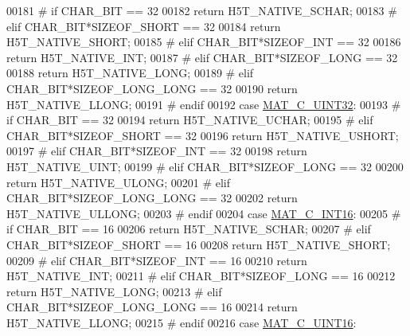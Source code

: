 \begin{DoxyCode}
00181 \textcolor{preprocessor}{#       if CHAR\_BIT == 32}
00182             \textcolor{keywordflow}{return} H5T\_NATIVE\_SCHAR;
00183 \textcolor{preprocessor}{#       elif CHAR\_BIT*SIZEOF\_SHORT == 32}
00184             \textcolor{keywordflow}{return} H5T\_NATIVE\_SHORT;
00185 \textcolor{preprocessor}{#       elif CHAR\_BIT*SIZEOF\_INT == 32}
00186             \textcolor{keywordflow}{return} H5T\_NATIVE\_INT;
00187 \textcolor{preprocessor}{#       elif CHAR\_BIT*SIZEOF\_LONG == 32}
00188             \textcolor{keywordflow}{return} H5T\_NATIVE\_LONG;
00189 \textcolor{preprocessor}{#       elif CHAR\_BIT*SIZEOF\_LONG\_LONG == 32}
00190             \textcolor{keywordflow}{return} H5T\_NATIVE\_LLONG;
00191 \textcolor{preprocessor}{#       endif}
00192         \textcolor{keywordflow}{case} \hyperlink{group___m_a_t_ggad4d60ae7b709fc81bfd744fb4c857c40a9a17a7edd45b19ef68197db81b27e816}{MAT\_C\_UINT32}:
00193 \textcolor{preprocessor}{#       if CHAR\_BIT == 32}
00194             \textcolor{keywordflow}{return} H5T\_NATIVE\_UCHAR;
00195 \textcolor{preprocessor}{#       elif CHAR\_BIT*SIZEOF\_SHORT == 32}
00196             \textcolor{keywordflow}{return} H5T\_NATIVE\_USHORT;
00197 \textcolor{preprocessor}{#       elif CHAR\_BIT*SIZEOF\_INT == 32}
00198             \textcolor{keywordflow}{return} H5T\_NATIVE\_UINT;
00199 \textcolor{preprocessor}{#       elif CHAR\_BIT*SIZEOF\_LONG == 32}
00200             \textcolor{keywordflow}{return} H5T\_NATIVE\_ULONG;
00201 \textcolor{preprocessor}{#       elif CHAR\_BIT*SIZEOF\_LONG\_LONG == 32}
00202             \textcolor{keywordflow}{return} H5T\_NATIVE\_ULLONG;
00203 \textcolor{preprocessor}{#       endif}
00204         \textcolor{keywordflow}{case} \hyperlink{group___m_a_t_ggad4d60ae7b709fc81bfd744fb4c857c40a40370e9de516c5036a67a5865c071006}{MAT\_C\_INT16}:
00205 \textcolor{preprocessor}{#       if CHAR\_BIT == 16}
00206             \textcolor{keywordflow}{return} H5T\_NATIVE\_SCHAR;
00207 \textcolor{preprocessor}{#       elif CHAR\_BIT*SIZEOF\_SHORT == 16}
00208             \textcolor{keywordflow}{return} H5T\_NATIVE\_SHORT;
00209 \textcolor{preprocessor}{#       elif CHAR\_BIT*SIZEOF\_INT == 16}
00210             \textcolor{keywordflow}{return} H5T\_NATIVE\_INT;
00211 \textcolor{preprocessor}{#       elif CHAR\_BIT*SIZEOF\_LONG == 16}
00212             \textcolor{keywordflow}{return} H5T\_NATIVE\_LONG;
00213 \textcolor{preprocessor}{#       elif CHAR\_BIT*SIZEOF\_LONG\_LONG == 16}
00214             \textcolor{keywordflow}{return} H5T\_NATIVE\_LLONG;
00215 \textcolor{preprocessor}{#       endif}
00216         \textcolor{keywordflow}{case} \hyperlink{group___m_a_t_ggad4d60ae7b709fc81bfd744fb4c857c40a8bede21dbf6c1edc0bbccc1481bccae7}{MAT\_C\_UINT16}:

\end{DoxyCode}
